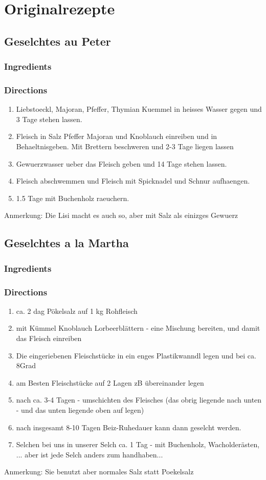 \section{Originalrezepte
}
\subsection{Geselchtes au Peter}
\subsubsection*{Ingredients}
\subsubsection*{Directions}
\begin{enumerate}
\item Liebstoeckl, Majoran, Pfeffer, Thymian Kuemmel in heisses Wasser gegen und 3 Tage stehen lassen.
\item Fleisch in Salz Pfeffer Majoran und Knoblauch einreiben und in Behaeltnisgeben. Mit Brettern beschweren und 2-3 Tage liegen lassen
\item Gewuerzwasser ueber das Fleisch geben und 14 Tage stehen lassen.
\item Fleisch abschwemmen und Fleisch mit Spicknadel und Schnur aufhaengen.
\item 1.5 Tage mit Buchenholz raeuchern.
\end{enumerate}
Anmerkung: Die Lisi macht es auch so, aber mit Salz als einizges Gewuerz
\pagebreak


\subsection{Geselchtes a la Martha}
\subsubsection*{Ingredients}
\subsubsection*{Directions}
\begin{enumerate}
\item ca. 2 dag Pökelsalz auf 1 kg Rohfleisch
\item mit  Kümmel Knoblauch Lorbeerblättern - eine Mischung bereiten, und damit das Fleisch einreiben
\item Die eingeriebenen Fleischstücke in ein enges Plastikwanndl  legen und bei ca. 8Grad 
\item am Besten Fleischstücke auf 2 Lagen zB übereinander legen
\item nach ca. 3-4 Tagen - umschichten des Fleisches (das obrig liegende nach unten - und das unten liegende oben auf legen)
\item nach insgesamt 8-10 Tagen Beiz-Ruhedauer kann dann geselcht werden. 
\item Selchen bei uns in unserer Selch ca. 1 Tag - mit Buchenholz, Wacholderästen, ... aber ist jede Selch anders zum handhaben...
\end{enumerate}
Anmerkung: Sie benutzt aber normales Salz statt Poekelsalz
\pagebreak

